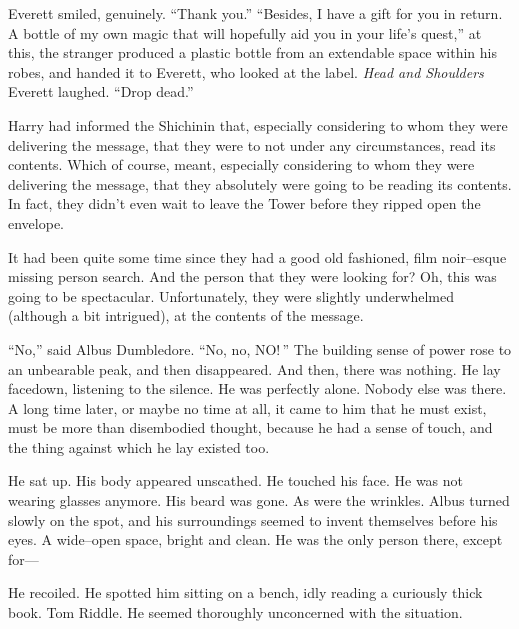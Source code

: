 Everett smiled, genuinely. “Thank you.”
\SmallVSpace
“Besides, I have a gift for you in return. A bottle of my own magic that will hopefully aid you in your life’s quest,” at this, the stranger produced a plastic bottle from an extendable space within his robes, and handed it to Everett, who looked at the label.
\SomeVSpace
\textit{Head and Shoulders}
\SomeVSpace
Everett laughed. “Drop dead.”
\simpleline


Harry had informed the Shichinin that, especially considering to whom they were delivering the message, that they were to not under any circumstances, read its contents. Which of course, meant, especially considering to whom they were delivering the message, that they absolutely were going to be reading its contents. In fact, they didn’t even wait to leave the Tower before they ripped open the envelope.

It had been quite some time since they had a good old fashioned, film noir\mbox{--}esque missing person search. And the person that they were looking for? Oh, this was going to be spectacular. Unfortunately, they were slightly underwhelmed (although a bit intrigued), at the contents of the message.
\begin{writtenNote}
\end{writtenNote}
\simpleline
{}

“No,” said Albus Dumbledore. “No, no, NO! ”
\SmallVSpace
The building sense of power rose to an unbearable peak, and then disappeared.
\SmallVSpace
And then, there was nothing.
\SmallVSpace
He lay facedown, listening to the silence. He was perfectly alone. Nobody else was there. A long time later, or maybe no time at all, it came to him that he must exist, must be more than disembodied thought, because he had a sense of touch, and the thing against which he lay existed too.

He sat up. His body appeared unscathed. He touched his face. He was not wearing glasses anymore. His beard was gone. As were the wrinkles.
\SmallVSpace
Albus turned slowly on the spot, and his surroundings seemed to invent themselves before his eyes. A wide\mbox{--}open space, bright and clean. He was the only person there, except for\mbox{---}

He recoiled. He spotted him sitting on a bench, idly reading a curiously thick book. Tom Riddle. He seemed thoroughly unconcerned with the situation.

